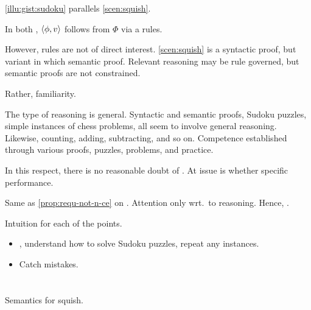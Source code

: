 \begin{note}
  \autoref{illu:gist:sudoku} parallels \autoref{scen:squish}.

  In both , \(\langle \phi, v \rangle\) follows from \(\Phi\) via a rules.

  However, rules are not of direct interest.
  \autoref{scen:squish} is a syntactic proof, but variant  in which semantic proof.
  Relevant reasoning may be rule governed, but semantic proofs are not constrained.

  Rather, familiarity.

  The type of reasoning is general.
  Syntactic and semantic proofs, Sudoku puzzles, simple instances of chess problems, all seem to involve general reasoning.
  Likewise, counting, adding, subtracting, and so on.
  Competence established through various proofs, puzzles, problems, and practice.

  In this respect, there is no reasonable doubt of \tR{}.
  At issue is whether specific performance.
\end{note}

\begin{note}
  Same as \autoref{prop:requ-not-n-ce} on .
  Attention only wrt.\ to reasoning.
  Hence, \wit{}.
\end{note}

\begin{note}
  Intuition for each of the points.

  \begin{itemize}
  \item
    , understand how to solve Sudoku puzzles, repeat any instances.
  \item
    Catch mistakes.
  \end{itemize}
\end{note}

\section{}
\label{sec:cscen1}


\begin{note}
  \begin{illustration}
    Semantics for squish.
  \end{illustration}
\end{note}



